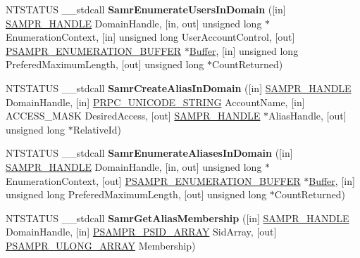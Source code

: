 \begin{DoxyCompactItemize}
\item 
\mbox{\label{interfacesamr_af36db9e153ea02ff14550f3e25beae13}} 
N\+T\+S\+T\+A\+T\+US \+\_\+\+\_\+stdcall {\bfseries Samr\+Enumerate\+Users\+In\+Domain} (\mbox{[}in\mbox{]} \hyperlink{interfacevoid}{S\+A\+M\+P\+R\+\_\+\+H\+A\+N\+D\+LE} Domain\+Handle, \mbox{[}in, out\mbox{]} unsigned long $\ast$Enumeration\+Context, \mbox{[}in\mbox{]} unsigned long User\+Account\+Control, \mbox{[}out\mbox{]} \hyperlink{struct___s_a_m_p_r___e_n_u_m_e_r_a_t_i_o_n___b_u_f_f_e_r}{P\+S\+A\+M\+P\+R\+\_\+\+E\+N\+U\+M\+E\+R\+A\+T\+I\+O\+N\+\_\+\+B\+U\+F\+F\+ER} $\ast$\hyperlink{class_buffer}{Buffer}, \mbox{[}in\mbox{]} unsigned long Prefered\+Maximum\+Length, \mbox{[}out\mbox{]} unsigned long $\ast$Count\+Returned)
\item 
\mbox{\label{interfacesamr_aad679e62f7e89e0c2d3cb063e3c489f6}} 
N\+T\+S\+T\+A\+T\+US \+\_\+\+\_\+stdcall {\bfseries Samr\+Create\+Alias\+In\+Domain} (\mbox{[}in\mbox{]} \hyperlink{interfacevoid}{S\+A\+M\+P\+R\+\_\+\+H\+A\+N\+D\+LE} Domain\+Handle, \mbox{[}in\mbox{]} \hyperlink{struct___r_p_c___u_n_i_c_o_d_e___s_t_r_i_n_g}{P\+R\+P\+C\+\_\+\+U\+N\+I\+C\+O\+D\+E\+\_\+\+S\+T\+R\+I\+NG} Account\+Name, \mbox{[}in\mbox{]} A\+C\+C\+E\+S\+S\+\_\+\+M\+A\+SK Desired\+Access, \mbox{[}out\mbox{]} \hyperlink{interfacevoid}{S\+A\+M\+P\+R\+\_\+\+H\+A\+N\+D\+LE} $\ast$Alias\+Handle, \mbox{[}out\mbox{]} unsigned long $\ast$Relative\+Id)
\item 
\mbox{\label{interfacesamr_a8fc4c6585938817b34d5abbdc80b4745}} 
N\+T\+S\+T\+A\+T\+US \+\_\+\+\_\+stdcall {\bfseries Samr\+Enumerate\+Aliases\+In\+Domain} (\mbox{[}in\mbox{]} \hyperlink{interfacevoid}{S\+A\+M\+P\+R\+\_\+\+H\+A\+N\+D\+LE} Domain\+Handle, \mbox{[}in, out\mbox{]} unsigned long $\ast$Enumeration\+Context, \mbox{[}out\mbox{]} \hyperlink{struct___s_a_m_p_r___e_n_u_m_e_r_a_t_i_o_n___b_u_f_f_e_r}{P\+S\+A\+M\+P\+R\+\_\+\+E\+N\+U\+M\+E\+R\+A\+T\+I\+O\+N\+\_\+\+B\+U\+F\+F\+ER} $\ast$\hyperlink{class_buffer}{Buffer}, \mbox{[}in\mbox{]} unsigned long Prefered\+Maximum\+Length, \mbox{[}out\mbox{]} unsigned long $\ast$Count\+Returned)
\item 
\mbox{\label{interfacesamr_a82a0d9328d20a473b780468401f18b7a}} 
N\+T\+S\+T\+A\+T\+US \+\_\+\+\_\+stdcall {\bfseries Samr\+Get\+Alias\+Membership} (\mbox{[}in\mbox{]} \hyperlink{interfacevoid}{S\+A\+M\+P\+R\+\_\+\+H\+A\+N\+D\+LE} Domain\+Handle, \mbox{[}in\mbox{]} \hyperlink{struct___s_a_m_p_r___p_s_i_d___a_r_r_a_y}{P\+S\+A\+M\+P\+R\+\_\+\+P\+S\+I\+D\+\_\+\+A\+R\+R\+AY} Sid\+Array, \mbox{[}out\mbox{]} \hyperlink{struct___s_a_m_p_r___u_l_o_n_g___a_r_r_a_y}{P\+S\+A\+M\+P\+R\+\_\+\+U\+L\+O\+N\+G\+\_\+\+A\+R\+R\+AY} Membership)

\end{DoxyCompactItemize}
